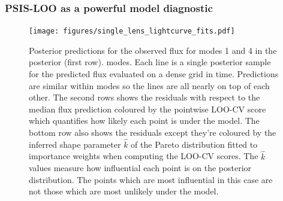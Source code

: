 \documentclass[12pt,dvipsnames]{report}
\begin{document}
\subsubsection{PSIS-LOO as a powerful model diagnostic}

\begin{figure}[t]
    \begin{centering}
        \texttt{[image: figures/single\_lens\_lightcurve\_fits.pdf]}
        \caption{Posterior predictions for the observed flux for modes 1 and 4 in
        the posterior (first row).
        modes. Each line is a single posterior sample for the predicted flux evaluated
        on a dense grid in time. Predictions are similar within modes so the lines 
        are all nearly on top of each other. The second rows shows the residuals with 
        respect to the median flux prediction coloured by the pointwise LOO-CV score
        which quantifies how likely each point is under the model.
        The bottom row also shows the residuals except they're coloured by the inferred 
        shape parameter $\hat k$ of the Pareto distribution fitted to importance weights 
        when computing the LOO-CV scores. The $\hat k$ values measure how influential 
        each point is on the posterior distribution. The points which are most 
        influential in this case are not those which are most unlikely under the model.}
            \label{fig:ogle_lightcurve_fits}
    \end{centering}
\end{figure}
\end{document}
